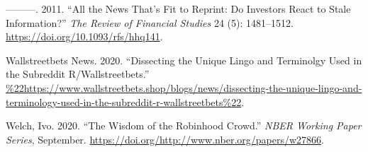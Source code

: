 \documentclass[12pt,]{article}
\begin{document}
\leavevmode\hypertarget{ref-tetlock2011}{}%
---------. 2011. ``All the News That's Fit to Reprint: Do Investors
React to Stale Information?'' \emph{The Review of Financial Studies} 24
(5): 1481--1512. \url{https://doi.org/10.1093/rfs/hhq141}.

\leavevmode\hypertarget{ref-wsbshop}{}%
Wallstreetbets News. 2020. ``Dissecting the Unique Lingo and Terminolgy
Used in the Subreddit R/Wallstreetbets.''
\url{\%22https://www.wallstreetbets.shop/blogs/news/dissecting-the-unique-lingo-and-terminology-used-in-the-subreddit-r-wallstreetbets\%22}.

\leavevmode\hypertarget{ref-welch2020}{}%
Welch, Ivo. 2020. ``The Wisdom of the Robinhood Crowd.'' \emph{NBER
Working Paper Series}, September.
\url{https://doi.org/http://www.nber.org/papers/w27866}.





\newpage
\singlespacing 
\end{document}
